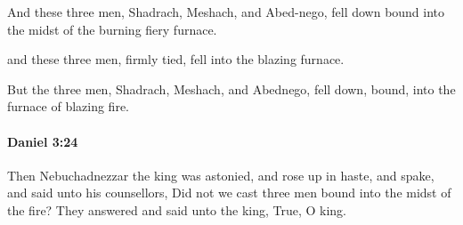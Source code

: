 			\begin{versebox}
					\item[BHS] 
					\item[LXX] 
					\item[ASV] And these three men, Shadrach, Meshach, and Abed-nego, fell down bound into the midst of the burning fiery furnace.
					\item[NIV] and these three men, firmly tied, fell into the blazing furnace.
					\item[NRSV] But the three men, Shadrach, Meshach, and Abednego, fell down, bound, into the furnace of blazing fire.
			\end{versebox}

		\paragraph{Daniel 3:24} %
			\label{DANIEL-3-24}

			Then Nebuchadnezzar the king was astonied, and rose up in haste, and spake, and said unto his counsellors, Did not we cast three men bound into the midst of the fire? They answered and said unto the king, True, O king.

